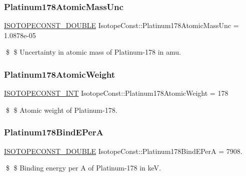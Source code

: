 \subsubsection{\texorpdfstring{Platinum178\+Atomic\+Mass\+Unc}{Platinum178AtomicMassUnc}}
{\footnotesize\ttfamily \mbox{\hyperlink{group___isotope_const-_macros_ga8f45a7272ce02c0b4c65c44636ed719a}{I\+S\+O\+T\+O\+P\+E\+C\+O\+N\+S\+T\+\_\+\+D\+O\+U\+B\+LE}} Isotope\+Const\+::\+Platinum178\+Atomic\+Mass\+Unc = 1.\+0878e-\/05}

\$ \$ Uncertainty in atomic mass of Platinum-\/178 in amu. \mbox{\label{group___isotope_const-_platinum-_pt178_ga63485d0cc51f2c7ec5275c561eb2e933}} 
\subsubsection{\texorpdfstring{Platinum178\+Atomic\+Weight}{Platinum178AtomicWeight}}
{\footnotesize\ttfamily \mbox{\hyperlink{group___isotope_const-_macros_ga5f18360b3e99483a35c32d789e62621c}{I\+S\+O\+T\+O\+P\+E\+C\+O\+N\+S\+T\+\_\+\+I\+NT}} Isotope\+Const\+::\+Platinum178\+Atomic\+Weight = 178}

\$ \$ Atomic weight of Platinum-\/178. \mbox{\label{group___isotope_const-_platinum-_pt178_gac273fcd284d29c98791e53cd430777f1}} 
\subsubsection{\texorpdfstring{Platinum178\+Bind\+E\+PerA}{Platinum178BindEPerA}}
{\footnotesize\ttfamily \mbox{\hyperlink{group___isotope_const-_macros_ga8f45a7272ce02c0b4c65c44636ed719a}{I\+S\+O\+T\+O\+P\+E\+C\+O\+N\+S\+T\+\_\+\+D\+O\+U\+B\+LE}} Isotope\+Const\+::\+Platinum178\+Bind\+E\+PerA = 7908.}

\$ \$ Binding energy per A of Platinum-\/178 in keV. \mbox{\label{group___isotope_const-_platinum-_pt178_ga06afa5500ef0a4e99b221497060d3025}} 
